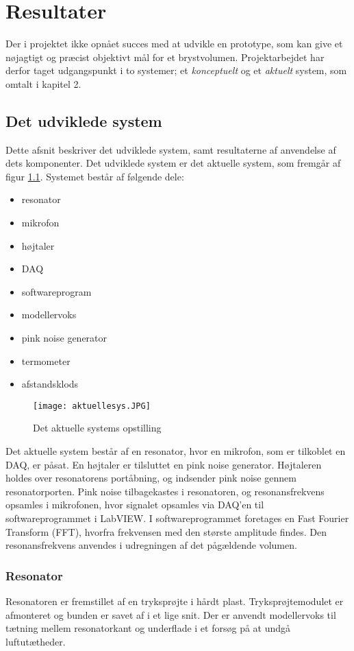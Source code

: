 \chapter{Resultater}
Der i projektet ikke opnået succes med at udvikle en prototype, som kan give et nøjagtigt og præcist objektivt mål for et brystvolumen. Projektarbejdet har derfor taget udgangspunkt i to systemer; et \textit{konceptuelt} og et \textit{aktuelt} system, som omtalt i kapitel 2.  

\section{Det udviklede system}
Dette afsnit beskriver det udviklede system, samt resultaterne af anvendelse af dets komponenter. 
Det udviklede system er det aktuelle system, som fremgår af figur \ref{fig:aktuellesys}. Systemet består af følgende dele: 

\begin{itemize}
\item resonator	
\item mikrofon 
\item højtaler
\item DAQ
\item softwareprogram
\item modellervoks
\item pink noise generator
\item termometer
\item afstandsklods
\end{itemize}

\begin{figure}[!h]
\centering
\texttt{[image: aktuellesys.JPG]}
\caption{Det aktuelle systems opstilling}
\label{fig:aktuellesys}	
\end{figure}

 Det aktuelle system består af en resonator, hvor en mikrofon, som er tilkoblet en DAQ, er påsat. En højtaler er tilsluttet en pink noise generator. Højtaleren holdes over resonatorens portåbning, og indsender pink noise gennem resonatorporten. Pink noise tilbagekastes i resonatoren, og resonansfrekvens opsamles i mikrofonen, hvor signalet opsamles via DAQ'en til softwareprogrammet i LabVIEW. I softwareprogrammet foretages en Fast Fourier Transform (FFT), hvorfra frekvensen med den største amplitude findes. Den resonansfrekvens anvendes i udregningen af det pågældende volumen.   

\subsection{Resonator}
Resonatoren er fremstillet af en tryksprøjte i hårdt plast. Tryksprøjtemodulet er afmonteret og bunden er savet af i et lige snit. Der er anvendt modellervoks til tætning mellem resonatorkant og underflade i et forsøg på at undgå luftutætheder. 

